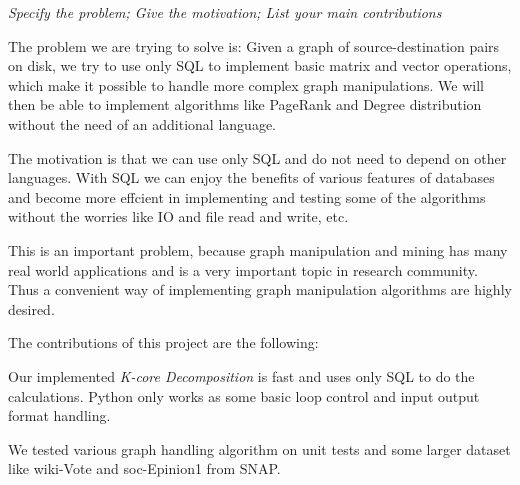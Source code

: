 {\small \em Specify the problem; Give the motivation; 
List your main contributions}

The problem we are trying to solve is: Given a graph of source-destination pairs on disk, we try to use only SQL to implement basic matrix and vector operations, which make it possible to handle more complex graph manipulations. We will then be able to implement algorithms like PageRank and Degree distribution without the need of an additional language.

The motivation is that we can use only SQL and do not need to depend on other languages. With SQL we can enjoy the benefits of various features of databases and become more effcient in implementing and testing some of the algorithms without the worries like IO and file read and write, etc.

This is an important problem, because graph manipulation and mining has many real world applications and is a very important topic in research community. Thus a convenient way of implementing graph manipulation algorithms are highly desired.

The contributions of this project are the following:
\bit
\item Our implemented {\em K-core Decomposition} is fast and uses only SQL to do the calculations. Python only works as 
some basic loop control and input output format handling.
\item We tested various graph handling algorithm on unit tests and some larger dataset like wiki-Vote and soc-Epinion1 from SNAP.
\eit
